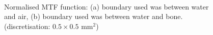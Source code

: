 \documentclass[11pt,a4paper]{article}
\begin{document}
\begin{figure}[!htb]
  \hspace*{\fill}%
  \hfill%
  \hspace*{\fill}\\
  \caption{Normalised MTF function: (a) boundary used was between water and air, (b) boundary used was between water and bone. (discretisation: $0.5 \times 0.5$ mm$^2$)}
  \label{fig:bpfMTF}
\end{figure}




\end{document}
